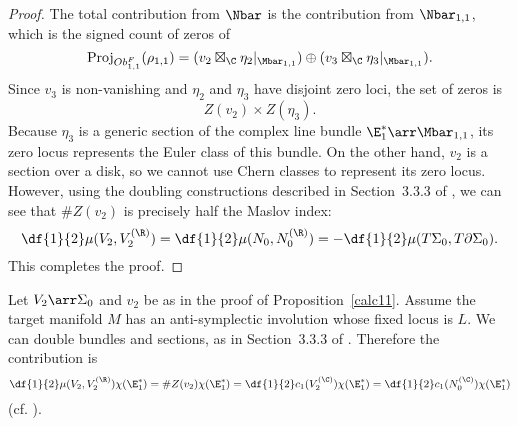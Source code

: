 \begin{proposition}
\begin{proof}
The total contribution from $\Nbar$ is the contribution from $\Nbar_{1,1}$, which is the signed count of zeros of
\[
\proj_{Ob_{1,1}^F}(\rho_{1,1}) = (v_2 \boxtimes_\C \eta_2|_{\Mbar_{1,1}}) \oplus (v_3 \boxtimes_\C \eta_3|_{\Mbar_{1,1}}).
\]
Since $v_3$ is non-vanishing and $\eta_2$ and $\eta_3$ have disjoint zero loci, the set of zeros is
\[
Z(v_2) \times Z(\eta_3).
\]
Because $\eta_3$ is a generic section of the complex line bundle $\E_1^* \arr \Mbar_{1,1}$, its zero locus represents the Euler class of this bundle. On the other hand, $v_2$ is a section over a disk, so we cannot use Chern classes to represent its zero locus. However, using the doubling constructions described in Section~3.3.3 of \cite{katzLiu}, we can see that $\#Z(v_2)$ is precisely half the Maslov index:
\[
\df{1}{2}\mu(V_2,V_2^{(\R)}) = \df{1}{2}\mu(N_0,N_0^{(\R)}) = -\df{1}{2}\mu(T\Sigma_0,T\partial\Sigma_0).
\]
This completes the proof.
\end{proof}
\end{proposition}

\begin{remark}
Let $V_2 \arr \Sigma_0$ and $v_2$ be as in the proof of Proposition~\ref{calc11}. Assume the target manifold $M$ has an anti-symplectic involution whose fixed locus is $L$. We can double bundles and sections, as in Section~3.3.3 of \cite{katzLiu}. Therefore the contribution is
\[
\df{1}{2}\mu(V_2,V_2^{(\R)})\chi(\E_1^*) = \#Z(v_2)\chi(\E_1^*) = \df{1}{2}c_1(V_2^{(\C)})\chi(\E_1^*) = \df{1}{2}c_1(N_0^{(\C)})\chi(\E_1^*)
\]
(cf. \cite{niuZinger}).
\end{remark}
